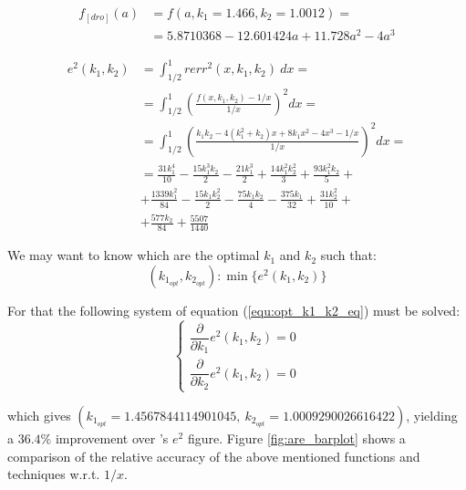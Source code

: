 \begin{equation}\label{equ:expanded_drom_0000}
\begin{aligned}
f_{[dro]}(a) &= f(a, k_1=1.466, k_2=1.0012) = \\
&= 5.8710368 - 12.601424 a + 11.728 a^2 - 4 a^3
\end{aligned}
\end{equation}

 \begin{equation}\label{equ:equation_e_squared_k1k2}
            \begin{aligned}
            e^2(k_1, k_2) &=  \int_{1/2}^{1} rerr^2(x, k_1, k_2)\ dx = \\
            &= \int_{1/2}^{1} \left( \frac{f(x, k_1, k_2) - 1/x}{1/x} \right)^2 dx = \\
            &= \int_{1/2}^{1} \left( \frac{k_1 k_2 - 4(k_1^2 + k_2) x + 8 k_1 x^2 - 4 x^3 - 1/x}{1/x} \right)^2 dx = \\
            &= \frac{31 k_{1}^{4}}{10} - \frac{15 k_{1}^{3} k_{2}}{2} - \frac{21 k_{1}^{3}}{2} + \frac{14 k_{1}^{2} k_{2}^{2}}{3} + \frac{93 k_{1}^{2} k_{2}}{5} + \\ 
            &+ \frac{1339 k_{1}^{2}}{84} - \frac{15 k_{1} k_{2}^{2}}{2} - \frac{75 k_{1} k_{2}}{4} - \frac{375 k_{1}}{32} + \frac{31 k_{2}^{2}}{10} + \\ 
            &+ \frac{577 k_{2}}{84} + \frac{5507}{1440}
            \end{aligned}
        \end{equation}
        
We may want to know which are the optimal $k_1$ and $k_2$ such that:
\begin{equation}\label{equ:opt_k1_k2_eq}
(k_{1_{opt}}, k_{2_{opt}}): \min\{e^2(k_1, k_2)\}
\end{equation} 

For that the following system of equation (\ref{equ:opt_k1_k2_eq}) must be solved:
\begin{equation}\label{equ:opt_k1_k2_eq_partial}
\begin{cases}
\dfrac{\partial}{\partial k_1} e^2(k_1, k_2) = 0 \\
\dfrac{\partial}{\partial k_2} e^2(k_1, k_2) = 0
\end{cases}
\end{equation} 

which gives $(k_{1_{opt}} = 1.4567844114901045,\ k_{2_{opt}} = 1.0009290026616422)$, yielding a $36.4\%$ improvement over \cite{drom}'s $e^2$ figure. Figure \ref{fig:are_barplot} shows a comparison of the relative accuracy of the above mentioned functions and techniques w.r.t. $1/x$.

